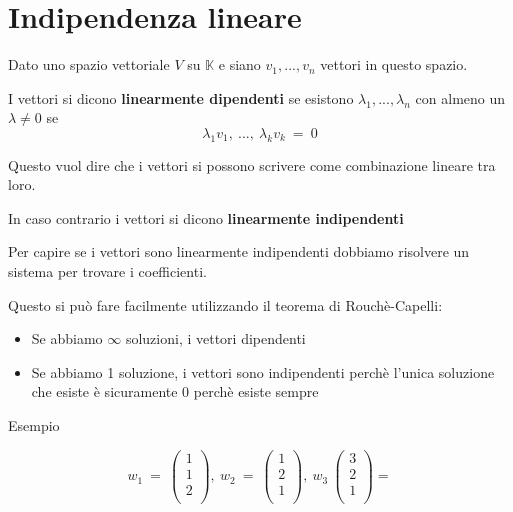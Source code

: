 \documentclass[a4paper, 10pt]{article}
\begin{document}
\section{Indipendenza lineare}

Dato uno spazio vettoriale $V$ su $\mathbb{K}$ e siano $v_1, ..., v_n$ vettori in questo spazio.

I vettori si dicono \textbf{linearmente dipendenti} se esistono $\lambda_1, ..., \lambda_n$ con almeno un $\lambda \neq 0$ se
$$\lambda_1v_1,\ ...,\ \lambda_kv_k\ =\ 0$$

Questo vuol dire che i vettori si possono scrivere come combinazione lineare tra loro.

In caso contrario i vettori si dicono \textbf{linearmente indipendenti}

Per capire se i vettori sono linearmente indipendenti dobbiamo risolvere un sistema per trovare i coefficienti.

Questo si può fare facilmente utilizzando il teorema di Rouchè-Capelli:

\begin{itemize}
	\item Se abbiamo $\infty$ soluzioni, i vettori dipendenti
	\item Se abbiamo 1 soluzione, i vettori sono indipendenti perchè l'unica soluzione che esiste è sicuramente 0 perchè esiste sempre
\end{itemize}

Esempio

$$w_1\ =\ \left(\begin{matrix}1\\1\\2\\\end{matrix}\right),\ w_2\ =\ \left(\begin{matrix}1\\2\\1\\\end{matrix}\right),\ w_3\ \left(\begin{matrix}3\\2\\1\\\end{matrix}\right)=$$
\end{document}

